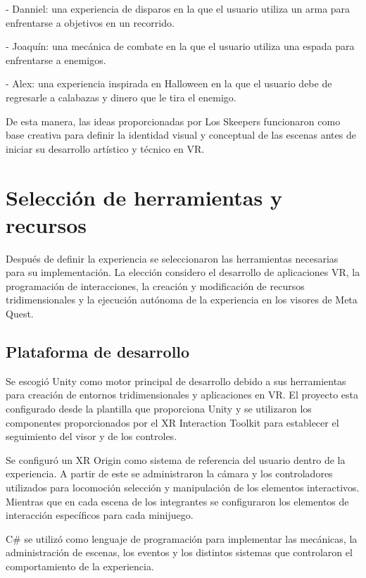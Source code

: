 - Danniel: una experiencia de disparos en la que el usuario utiliza un arma para enfrentarse a objetivos en un recorrido. 

- Joaquín: una mecánica de combate en la que el usuario utiliza una espada para enfrentarse a enemigos. 

- Alex: una experiencia inspirada en Halloween en la que el usuario debe de regresarle a calabazas y dinero que le tira el enemigo. 

De esta manera, las ideas proporcionadas por Los Skeepers funcionaron como base creativa para definir la identidad visual y conceptual de las escenas antes de iniciar su desarrollo artístico y técnico en VR.  

\section{Selección de herramientas y recursos}
Después de definir la experiencia se seleccionaron las herramientas necesarias para su implementación. La elección considero el desarrollo de aplicaciones VR, la programación de interacciones, la creación y modificación de recursos tridimensionales y la ejecución autónoma de la experiencia en los visores de Meta Quest.

\subsection{Plataforma de desarrollo}
Se escogió Unity como motor principal de desarrollo debido a sus herramientas para creación de entornos tridimensionales y aplicaciones en VR. El proyecto esta configurado desde la plantilla que proporciona Unity y se utilizaron los componentes proporcionados por el XR Interaction Toolkit para establecer el seguimiento del visor y de los controles. 

Se configuró un XR Origin como sistema de referencia del usuario dentro de la experiencia. A partir de este se administraron la cámara y los controladores utilizados para locomoción selección y manipulación de los elementos interactivos. Mientras que en cada escena de los integrantes se configuraron los elementos de interacción específicos para cada minijuego.

C\# se utilizó como lenguaje de programación para implementar las mecánicas, la administración de escenas, los eventos y los distintos sistemas que controlaron el comportamiento de la experiencia. 

